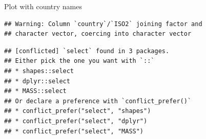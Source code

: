 \documentclass[ignorenonframetext,]{beamer}
\newenvironment{Shaded}{\begin{snugshade}}{\end{snugshade}}
\newcommand{\DataTypeTok}[1]{\textcolor[rgb]{0.13,0.29,0.53}{#1}}
\newcommand{\DecValTok}[1]{\textcolor[rgb]{0.00,0.00,0.81}{#1}}
\newcommand{\FloatTok}[1]{\textcolor[rgb]{0.00,0.00,0.81}{#1}}
\newcommand{\KeywordTok}[1]{\textcolor[rgb]{0.13,0.29,0.53}{\textbf{#1}}}
\newcommand{\NormalTok}[1]{#1}
\newcommand{\OperatorTok}[1]{\textcolor[rgb]{0.81,0.36,0.00}{\textbf{#1}}}
\newcommand{\StringTok}[1]{\textcolor[rgb]{0.31,0.60,0.02}{#1}}
\begin{document}
\begin{frame}[fragile]{Plot with country names}
\protect\hypertarget{plot-with-country-names}{}

\begin{Shaded}
\end{Shaded}

\begin{verbatim}
## Warning: Column `country`/`ISO2` joining factor and
## character vector, coercing into character vector
\end{verbatim}

\begin{verbatim}
## [conflicted] `select` found in 3 packages.
## Either pick the one you want with `::` 
## * shapes::select
## * dplyr::select
## * MASS::select
## Or declare a preference with `conflict_prefer()`
## * conflict_prefer("select", "shapes")
## * conflict_prefer("select", "dplyr")
## * conflict_prefer("select", "MASS")
\end{verbatim}

\end{frame}
\end{document}
